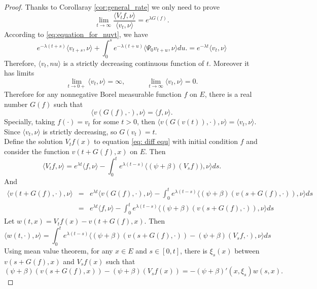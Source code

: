 \documentclass[12pt,a4paper]{amsart}
\numberwithin{equation}{section}
\theoremstyle{plain}
\theoremstyle{definition}
\begin{document}
\begin{proof}
	Thanks to Corollaray \ref{cor:general_rate} we only need to prove
  \begin{equation}\label{eq:spec_ratio}
    \lim_{t\rightarrow\infty}\frac{\langle V_tf,\nu\rangle }{\langle v_t,\nu\rangle }=e^{\lambda G(f)}.
  \end{equation}
  According to \eqref{eq:equation_for_nuvt}, we have
  \begin{equation}\label{eq:monotone}
    e^{-\lambda(t+s)}\langle v_{t+s},\nu\rangle + \int_0^se^{-\lambda(t+u)}\langle \Psi_0 v_{t+u},\nu\rangle du. 
= e^{-\lambda t} \langle v_t,\nu\rangle 
  \end{equation}
 	Therefore, $\langle v_t,nu\rangle $ is a strictly decreasing continuous function of $t$.  Moreover it has limits
  \[
    \lim_{t\rightarrow 0+}\langle v_t,\nu\rangle =\infty,\qquad\quad \lim_{t\rightarrow\infty}\langle v_t,\nu\rangle =0.
  \]
	Therefore for any nonnegative Borel measurable function $f$ on $E$, there is a real number $G(f)$ such that
  \begin{equation}\label{eq:def_of_G}
    \langle v(G(f),\cdot),\nu\rangle =\langle f,\nu\rangle .
  \end{equation}
	Specially, taking $f(\cdot)=v_t$ for some $t>0$, then $\langle v(G(v(t)),\cdot),\nu\rangle =\langle v_t,\nu\rangle $.
	Since  $\langle v_t,\nu\rangle $ is strictly decreasing, so $G(v_t)=t$.\\
	Define the solution $V_tf(x)$ to equation \eqref{eq: diff equ} with initial condition $f$ and consider the function $v(t+G(f),x)$ on $E$. Then
  \[
    \langle V_tf,\nu\rangle =e^{\lambda t}\langle f,\nu\rangle -\int_0^te^{\lambda(t-s)}\langle (\psi+\beta)(V_sf)),\nu\rangle ds.
  \]
	And
  \begin{eqnarray*}
    \langle v(t+G(f),\cdot),\nu\rangle &=&e^{\lambda t}\langle v(G(f),\cdot),\nu\rangle -\int_0^te^{\lambda(t-s)}\langle (\psi+\beta)(v(s+G(f),\cdot)),\nu\rangle ds\\
                                       &=&e^{\lambda t}\langle f,\nu\rangle -\int_0^te^{\lambda (t-s)}\langle (\psi+\beta)(v(s+G(f),\cdot)),\nu\rangle ds
  \end{eqnarray*}
	Let $w(t,x)=V_tf(x)-v(t+G(f),x)$. Then
  \[
    \langle w(t,\cdot),\nu\rangle =\int_0^te^{\lambda(t-s)}\langle (\psi+\beta)(v(s+G(f),\cdot))-(\psi+\beta)(V_sf,\cdot),\nu\rangle ds
  \]
	Using mean value theorem, for any $x\in E$ and $s\in [0,t]$, there is $\xi_s(x)$ between $v(s+G(f),x)$ and $V_sf(x)$ such that
  \[
    (\psi+\beta)(v(s+G(f),x))-(\psi+\beta)(V_sf(x))=-(\psi+\beta)'(x, \xi_s)w(s,x).
\]
\end{proof}
\end{document}

